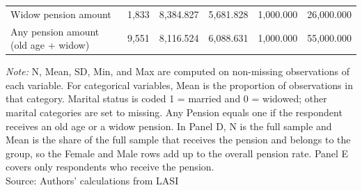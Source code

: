 \begin{table}[H]
{\begin{tabular}{lrrrrr}
Widow pension amount & 1,833 & 8,384.827 & 5,681.828 & 1,000.000 & 26,000.000 \\
Any pension amount (old age + widow) & 9,551 & 8,116.524 & 6,088.631 & 1,000.000 & 55,000.000 \\
\bottomrule
\end{tabular}
}
\vspace{2mm}
\begin{minipage}{0.95\textwidth}
\footnotesize \textit{Note:} N, Mean, SD, Min, and Max are computed on non-missing observations of each variable. For categorical variables, Mean is the proportion of observations in that category. Marital status is coded 1 = married and 0 = widowed; other marital categories are set to missing. Any Pension equals one if the respondent receives an old age or a widow pension. In Panel D, N is the full sample and Mean is the share of the full sample that receives the pension and belongs to the group, so the Female and Male rows add up to the overall pension rate. Panel E covers only respondents who receive the pension. \\
Source: Authors' calculations from LASI
\end{minipage}
\end{table}
